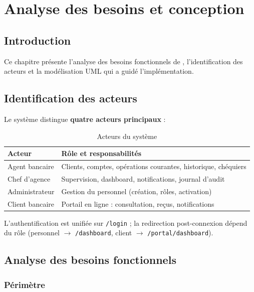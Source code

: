 \chapter{Analyse des besoins et conception}
\label{ch:conception}

\section{Introduction}

Ce chapitre présente l'analyse des besoins fonctionnels de \nomapplication, l'identification des acteurs et la modélisation UML qui a guidé l'implémentation.

\section{Identification des acteurs}

Le système distingue \textbf{quatre acteurs principaux} :

\begin{table}[H]
    \centering
    \caption{Acteurs du système \nomapplication}
    \label{tab:acteurs}
    \begin{tabular}{@{}lp{9cm}@{}}
        \toprule
        \textbf{Acteur} & \textbf{Rôle et responsabilités} \\
        \midrule
        Agent bancaire & Clients, comptes, opérations courantes, historique, chéquiers \\
        Chef d'agence & Supervision, dashboard, notifications, journal d'audit \\
        Administrateur & Gestion du personnel (création, rôles, activation) \\
        Client bancaire & Portail en ligne : consultation, reçus, notifications \\
        \bottomrule
    \end{tabular}
\end{table}

L'authentification est unifiée sur \texttt{/login} ; la redirection post-connexion dépend du rôle (personnel $\rightarrow$ \texttt{/dashboard}, client $\rightarrow$ \texttt{/portal/dashboard}).

\section{Analyse des besoins fonctionnels}

\subsection{Périmètre}


